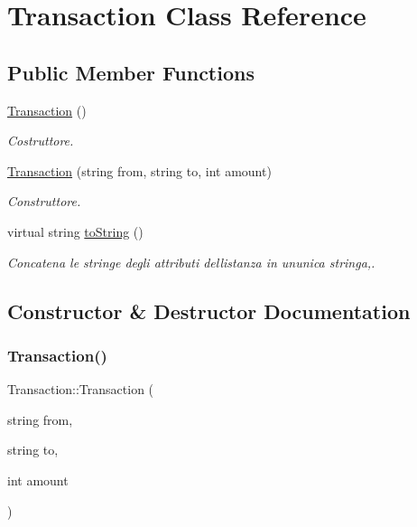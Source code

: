 \hypertarget{class_transaction}{}\section{Transaction Class Reference}
\label{class_transaction}
\subsection*{Public Member Functions}
\begin{DoxyCompactItemize}
\item 
\mbox{\label{class_transaction_ab47005b855d38bc324bb79fd023baa13}} 
\mbox{\hyperlink{class_transaction_ab47005b855d38bc324bb79fd023baa13}{Transaction}} ()
\begin{DoxyCompactList}\small\item\em Costruttore. \end{DoxyCompactList}\item 
\mbox{\hyperlink{class_transaction_ab239f7841c582b4670104d4d0178aa63}{Transaction}} (string from, string to, int amount)
\begin{DoxyCompactList}\small\item\em Construttore. \end{DoxyCompactList}\item 
virtual string \mbox{\hyperlink{class_transaction_a41993d9cc801028242eeac331e7e1ff5}{to\+String}} ()
\begin{DoxyCompactList}\small\item\em Concatena le stringe degli attributi dell\textquotesingle{}istanza in un\textquotesingle{}unica stringa,. \end{DoxyCompactList}\end{DoxyCompactItemize}


\subsection{Constructor \& Destructor Documentation}
\mbox{\label{class_transaction_ab239f7841c582b4670104d4d0178aa63}} 
\subsubsection{\texorpdfstring{Transaction()}{Transaction()}}
{\footnotesize\ttfamily Transaction\+::\+Transaction (\begin{DoxyParamCaption}\item[{string}]{from,  }\item[{string}]{to,  }\item[{int}]{amount }\end{DoxyParamCaption})}



